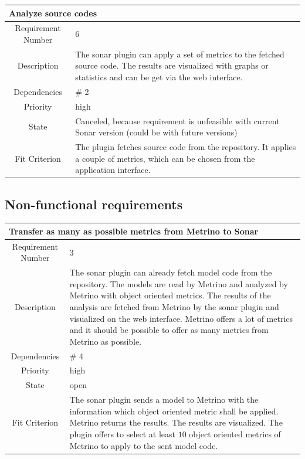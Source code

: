 \begin{longtable}{|c|p{10cm}|}
\hline 
\multicolumn{2}{|l|}{\textbf{Analyze source codes}} \\ 
\hline 
Requirement Number & 6 \\ \hline 
Description & The sonar plugin can apply a set of metrics to the fetched source code. The results are visualized with graphs or statistics and can be get via the web interface. \\ \hline 
Dependencies & \# 2 \\ \hline 
Priority & high \\ \hline 
State & Canceled, because requirement is unfeasible with current Sonar version (could be with future versions) \\ \hline 
Fit Criterion & The plugin fetches source code from the repository. It applies a couple of metrics, which can be chosen from the application interface. \\ \hline
\end{longtable}

\subsection{Non-functional requirements}
\begin{longtable}{|c|p{10cm}|}
\hline 
\multicolumn{2}{|l|}{\textbf{Transfer as many as possible metrics from Metrino to Sonar}} \\ 
\hline 
Requirement Number & 3 \\ \hline 
Description & The sonar plugin can already fetch model code from the repository. The models are read by Metrino and analyzed by Metrino with object oriented metrics. The results of the analysis are fetched from Metrino by the sonar plugin and visualized on the web interface. Metrino offers a lot of metrics and it should be possible to offer as many metrics from Metrino as possible. \\ \hline 
Dependencies & \# 4 \\ \hline 
Priority & high \\ \hline 
State & open \\ \hline 
Fit Criterion & The sonar plugin sends a model to Metrino with the information which object oriented metric shall be applied. Metrino returns the results. The results are visualized. The plugin offers to select at least $10$ object oriented metrics of Metrino to apply to the sent model code. \\ \hline
\end{longtable}

